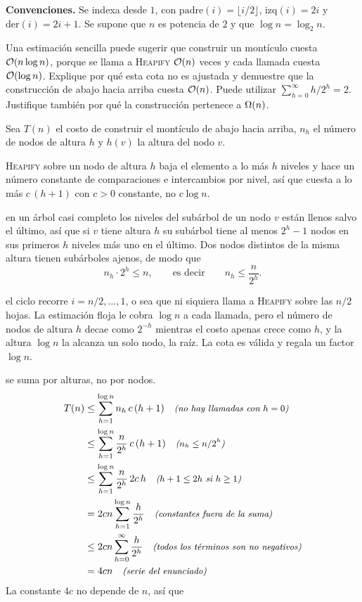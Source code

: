 \documentclass[11pt,letterpaper]{article}
\begin{document}

\noindent\textbf{Convenciones.}
Se indexa desde $1$, con $\mathrm{padre}(i) = \lfloor i/2
\rfloor$, $\mathrm{izq}(i) = 2i$ y $\mathrm{der}(i) = 2i + 1$.
Se supone que $n$ es potencia de $2$ y que
$\log n = \log_2 n$.

\noindent Una estimación sencilla puede sugerir que construir un
montículo cuesta $\mathcal{O}\!\left(n \log n\right)$, porque se llama a \textsc{Heapify}
$\mathcal{O}\!\left(n\right)$ veces y cada llamada cuesta $\mathcal{O}\!\left(\log n\right)$. Explique por qué
esta cota no es ajustada y demuestre que la construcción de abajo
hacia arriba cuesta $\mathcal{O}\!\left(n\right)$. Puede utilizar
$\sum_{h=0}^{\infty} h/2^{h} = 2$. Justifique también por qué la
construcción pertenece a $\Omega\!\left(n\right)$.

Sea $T(n)$ el costo de construir el montículo de abajo hacia arriba,
$n_h$ el número de nodos de altura $h$ y $h(v)$ la altura del nodo
$v$.

 \textsc{Heapify} sobre un nodo de
altura $h$ baja el elemento a lo más $h$ niveles y hace un número
constante de comparaciones e intercambios por nivel, así que cuesta a
lo más $c\,(h+1)$ con $c > 0$ constante, no $c \log n$.

 en un árbol casi completo los niveles del
subárbol de un nodo $v$ están llenos salvo el último, así que si $v$
tiene altura $h$ su subárbol tiene al menos $2^{h} - 1$ nodos en sus
primeros $h$ niveles más uno en el último. Dos nodos distintos de la
misma altura tienen subárboles ajenos, de modo que
\[
  n_h \cdot 2^{h} \le n,
  \qquad\text{es decir}\qquad
  n_h \le \frac{n}{2^{h}}.
\]

 el ciclo recorre
$i = n/2, \dots, 1$, o sea que ni siquiera llama a \textsc{Heapify}
sobre las $n/2$ hojas. La estimación floja le cobra $\log n$ a cada
llamada, pero el número de nodos de altura $h$ decae como $2^{-h}$
mientras el costo apenas crece como $h$, y la altura $\log n$ la
alcanza un solo nodo, la raíz. La cota es válida y regala un factor
$\log n$.

 se suma por alturas, no por nodos.
\begin{align*}
  T(n) &\le \sum_{h=1}^{\log n} n_h \, c\,(h+1)
        \quad\text{\small\itshape (no hay llamadas con $h = 0$)} \\
       &\le \sum_{h=1}^{\log n} \frac{n}{2^{h}}\, c\,(h+1)
        \quad\text{\small\itshape ($n_h \le n/2^{h}$)} \\
       &\le \sum_{h=1}^{\log n} \frac{n}{2^{h}}\, 2c\,h
        \quad\text{\small\itshape ($h + 1 \le 2h$ si $h \ge 1$)} \\
       &= 2cn \sum_{h=1}^{\log n} \frac{h}{2^{h}}
        \quad\text{\small\itshape (constantes fuera de la suma)} \\
       &\le 2cn \sum_{h=0}^{\infty} \frac{h}{2^{h}}
        \quad\text{\small\itshape (todos los términos son no negativos)} \\
       &= 4cn
        \quad\text{\small\itshape (serie del enunciado)}
\end{align*}
La constante $4c$ no depende de $n$, así que
\end{document}
